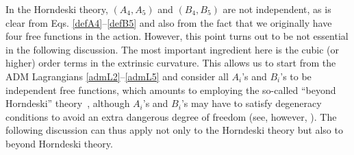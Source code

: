 \documentclass[aps,prd,preprint,superscriptaddress,nofootinbib,tightenlines]{revtex4-1}
\begin{document}
In the Horndeski theory, $(A_4,A_5)$
and $(B_4,B_5)$ are not independent,
as is clear from
Eqs. \eqref{defA4}--\eqref{defB5} and also from
the fact that we originally have four free functions in the action.
However, this point turns out to be not essential in the following discussion.
The most important ingredient here is the cubic (or higher) order terms
in the extrinsic curvature.
This allows us to start from the ADM Lagrangians \eqref{admL2}--\eqref{admL5}
and consider all $A_i$'s and $B_i$'s to be independent free functions,
which amounts to employing the so-called ``beyond Horndeski'' theory~\cite{Gleyzes:2014dya}, 
although $A_i$'s and $B_i$'s may have to satisfy degeneracy conditions to avoid an extra dangerous degree of freedom 
\cite{Langlois:2015cwa,Crisostomi:2016tcp} (see, however, \cite{DeFelice:2018ewo}).
The following discussion can thus apply not only to the Horndeski theory
but also to beyond Horndeski theory.
\end{document}

